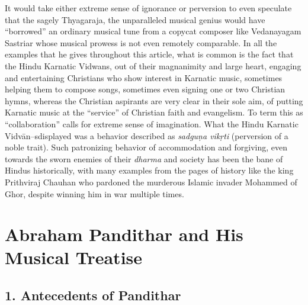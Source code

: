 It would take either extreme sense of ignorance or perversion to even speculate that the sagely Thyagaraja, the unparalleled musical genius would have “borrowed” an ordinary musical tune from a copycat composer like Vedanayagam Sastriar whose musical prowess is not even remotely comparable. In all the examples that he gives throughout this article, what is common is the fact that the Hindu Karnatic Vidwans, out of their magnanimity and large heart, engaging and entertaining Christians who show interest in Karnatic music, sometimes helping them to compose songs, sometimes even signing one or two Christian hymns, whereas the Christian aspirants are very clear in their sole aim, of putting Karnatic music at the “service” of Christian faith and evangelism. To term this as “collaboration” calls for extreme sense of imagination. What the Hindu Karnatic Vidvān–s\break displayed was a behavior described as \textit{sadguṇa vikṛti} (perversion of a noble trait). Such patronizing behavior of accommodation and forgiving, even towards the sworn enemies of their \textit{dharma} and society has been the bane of Hindus historically, with many examples from the pages of history like the king Prithviraj Chauhan who pardoned the murderous Islamic invader Mohammed of Ghor, despite winning him in war multiple times.

\vspace{-.2cm}

\section*{Abraham Pandithar and His Musical Treatise}

\subsection*{1. Antecedents of Pandithar}

